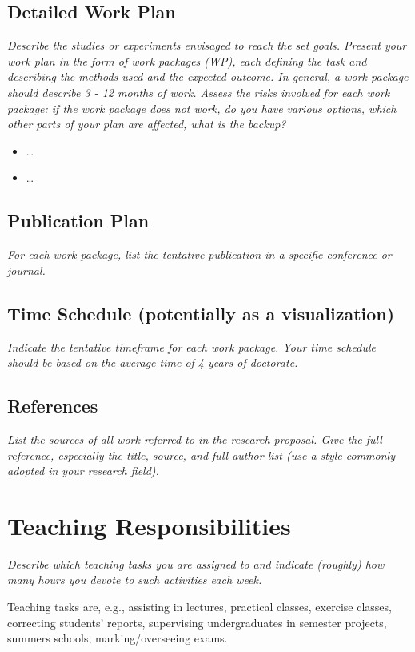 \documentclass[11pt]{article}
\newcommand{\suggestion}[1]{{\itshape #1}}
\begin{document}
\subsection{Detailed Work Plan}
\suggestion{
Describe the studies or experiments envisaged to reach the set goals.
Present your work plan in the form of work packages (WP), each defining the task and describing the methods used and the expected outcome.
In general, a work package should describe 3 - 12 months of work.
Assess the risks involved for each work package: if the work package does not work, do you have various options, which other parts of your plan are affected, what is the backup?

\begin{itemize}
    \item [WP 1:] \dots
    \item [WP 2:] \dots
\end{itemize}
}

\subsection{Publication Plan}
\suggestion{
For each work package, list the tentative publication in a specific conference or journal.
}

\subsection{Time Schedule (potentially as a visualization)}
\suggestion{
Indicate the tentative timeframe for each work package.
Your time schedule should be based on the average time of 4 years of doctorate. 
}

\subsection{References}
\suggestion{
List the sources of all work referred to in the research proposal.
Give the full reference, especially the title, source, and full author list (use a style commonly adopted in your research field).
}

\section{Teaching Responsibilities}
\suggestion{
Describe which teaching tasks you are assigned to and indicate (roughly) how many hours you devote to such activities each week.

Teaching tasks are, e.g., assisting in lectures, practical classes, exercise classes, correcting students’ reports, supervising undergraduates in semester projects, summers schools, marking/overseeing exams.
}
\end{document}
